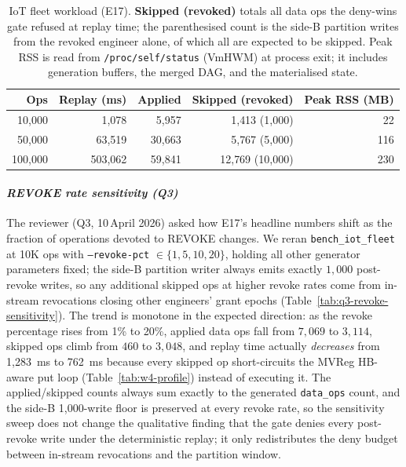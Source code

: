 \documentclass[10pt,journal,compsoc]{IEEEtran}
\begin{document}
\begin{table}[!htbp]
\centering
\caption{IoT fleet workload (E17). \textbf{Skipped (revoked)} totals all data ops the deny-wins gate refused at replay time; the parenthesised count is the side-B partition writes from the revoked engineer alone, of which all are expected to be skipped. Peak RSS is read from \texttt{/proc/self/status} (VmHWM) at process exit; it includes generation buffers, the merged DAG, and the materialised state.}
\label{tab:e17-iot-fleet}
\footnotesize
\begin{tabular}{@{}rrrrr@{}}
\toprule
\textbf{Ops} & \textbf{Replay (ms)} & \textbf{Applied} & \textbf{Skipped (revoked)} & \textbf{Peak RSS (MB)} \\
\midrule
10{,}000  & 1{,}078  & 5{,}957 & 1{,}413 (1{,}000)  & 22  \\
50{,}000  & 63{,}519 & 30{,}663 & 5{,}767 (5{,}000)  & 116 \\
100{,}000 & 503{,}062 & 59{,}841 & 12{,}769 (10{,}000) & 230 \\
\bottomrule
\end{tabular}
\end{table}

\paragraph*{\textbf{\textit{REVOKE rate sensitivity (Q3)}}}
The reviewer (Q3, 10\,April 2026) asked how E17's headline numbers shift as the fraction of operations devoted to \textsc{REVOKE} changes. We reran \texttt{bench\_iot\_fleet} at 10K ops with \texttt{--revoke-pct} $\in \{1, 5, 10, 20\}$, holding all other generator parameters fixed; the side-B partition writer always emits exactly $1{,}000$ post-revoke writes, so any additional skipped ops at higher revoke rates come from in-stream revocations closing other engineers' grant epochs (Table~\ref{tab:q3-revoke-sensitivity}). The trend is monotone in the expected direction: as the revoke percentage rises from 1\% to 20\%, applied data ops fall from $7{,}069$ to $3{,}114$, skipped ops climb from $460$ to $3{,}048$, and replay time actually \emph{decreases} from 1{,}283~ms to 762~ms because every skipped op short-circuits the MVReg HB-aware put loop (Table~\ref{tab:w4-profile}) instead of executing it. The applied/skipped counts always sum exactly to the generated \texttt{data\_ops} count, and the side-B 1{,}000-write floor is preserved at every revoke rate, so the sensitivity sweep does not change the qualitative finding that the gate denies every post-revoke write under the deterministic replay; it only redistributes the deny budget between in-stream revocations and the partition window.
\end{document}
